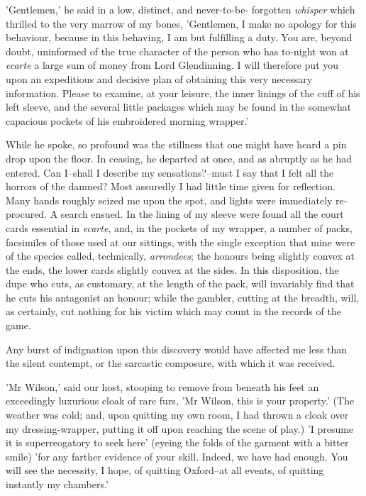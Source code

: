 \documentclass[12pt]{book}
\begin{document}
     'Gentlemen,' he said in a low, distinct, and never-to-be-
forgotten \emph{whisper} which thrilled to the very marrow of my
bones, 'Gentlemen, I make no apology for this behaviour, because in
this behaving, I am but fulfilling a duty.  You are, beyond doubt,
uninformed of the true character of the person who has to-night won
at \emph{ecarte} a large sum of money from Lord Glendinning.  I 
will therefore put you upon an expeditious and decisive plan of
obtaining this very necessary information.  Please to examine, at
your leisure, the inner linings of the cuff of his left sleeve, and
the several little packages which may be found in the somewhat
capacious pockets of his embroidered morning wrapper.'

     While he spoke, so profound was the stillness that one might
have heard a pin drop upon the floor.  In ceasing, he departed at
once, and as abruptly as he had entered.  Can I--shall I describe
my sensations?--must I say that I felt all the horrors of the
damned?  Most assuredly I had little time given for reflection. 
Many hands roughly seized me upon the spot, and lights were
immediately re-procured.  A search ensued.  In the lining of my
sleeve were found all the court cards essential in \emph{ecarte}, and,
in the pockets of my wrapper, a number of packs, facsimiles of
those used at our sittings, with the single exception that mine
were of the species called, technically, \emph{arrondees}; the honours
being slightly convex at the ends, the lower cards slightly convex
at the sides.  In this disposition, the dupe who cuts, as
customary, at the length of the pack, will invariably find that he
cuts his antagonist an honour; while the gambler, cutting at the
breadth, will, as certainly, cut nothing for his victim which may
count in the records of the game.

     Any burst of indignation upon this discovery would have
affected me less than the silent contempt, or the sarcastic
composure, with which it was received.

     'Mr Wilson,' said our host, stooping to remove from beneath
his feet an exceedingly luxurious cloak of rare furs, 'Mr Wilson,
this is your property.'  (The weather was cold; and, upon quitting
my own room, I had thrown a cloak over my dressing-wrapper, putting
it off upon reaching the scene of play.)  'I presume it is
superreogatory to seek here' (eyeing the folds of the garment with
a bitter smile) 'for any farther evidence of your skill.  Indeed,
we have had enough.  You will see the necessity, I hope, of
quitting Oxford--at all events, of quitting instantly my chambers.'
\end{document}
